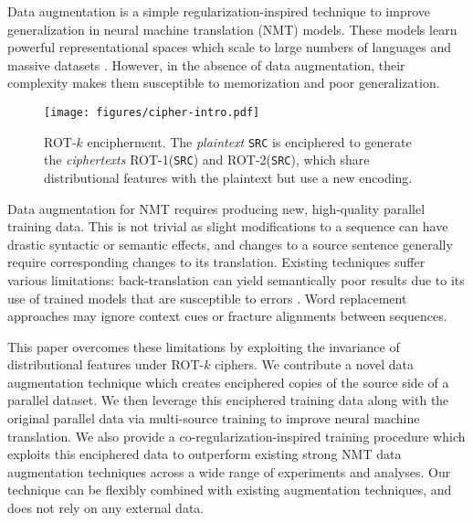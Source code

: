 \documentclass[11pt]{article}
\begin{document}
Data augmentation is a simple regularization-inspired technique to improve generalization in neural machine translation (NMT) models.
These models \cite{bahdanau2015attn, vaswani2017attention} learn powerful representational spaces \cite{raganato2018analysis, voita2019analyzing, kudugunta2019investigating} which scale to large numbers of languages and massive datasets \cite{aharoni-etal-2019-massively}. 
However, in the absence of data augmentation, their complexity makes them susceptible to memorization and poor generalization.

\begin{figure}
    \centering
    \texttt{[image: figures/cipher-intro.pdf]}
    \caption{ROT-$k$ encipherment. 
The \emph{plaintext} \texttt{SRC} is enciphered to generate the \emph{ciphertexts} ROT-1(\texttt{SRC}) and ROT-2(\texttt{SRC}), which share distributional features with the plaintext but use a new encoding.}
    \label{fig:rotk}
\end{figure}

Data augmentation for NMT requires producing new, high-quality parallel training data.
This is not trivial as slight modifications to a sequence can have drastic syntactic or semantic effects, and changes to a source sentence generally require corresponding changes to its translation.
Existing techniques suffer various limitations:
back-translation \cite{sennrich2016improving, edunov2018understanding, xia2019generalized, nguyen19datadiverse}
can yield semantically poor results due to its use of trained models that are susceptible to errors \cite{edunov2018understanding}.
Word replacement approaches \cite{gao-etal-2019-soft, liu-etal-2021-counterfactual, takase-kiyono-2021-rethinking, belinkov2018synthetic, sennrich-etal-2016-edinburgh, guo-etal-2020-sequence, wu-etal-2021-mixseq}
may ignore context cues or fracture alignments between 
sequences. 

This paper overcomes these limitations by 
exploiting the invariance of 
distributional features under ROT-$k$ ciphers. 
We contribute a novel data augmentation technique 
which creates enciphered copies of the source side of a parallel dataset. 
We then leverage this enciphered training data along with the original parallel data via multi-source training to improve neural machine translation. 
We also provide a co-regularization-inspired training procedure which exploits this enciphered data to outperform existing strong NMT data augmentation techniques across a wide range of experiments and analyses. Our technique can be flexibly combined with existing augmentation techniques, and does not rely on any external data. 
\end{document}
